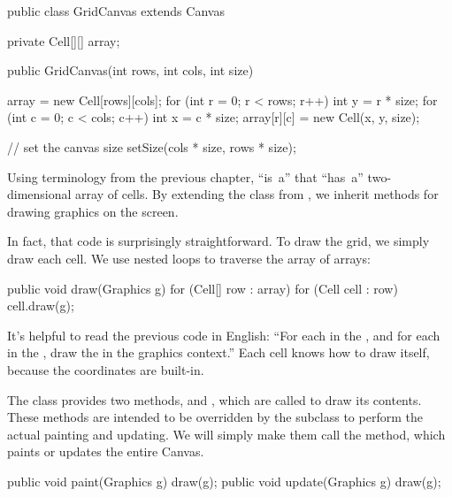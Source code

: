\begin{code}
public class GridCanvas extends Canvas {
    private Cell[][] array;

    public GridCanvas(int rows, int cols, int size) {
        array = new Cell[rows][cols];
        for (int r = 0; r < rows; r++) {
            int y = r * size;
            for (int c = 0; c < cols; c++) {
                int x = c * size;
                array[r][c] = new Cell(x, y, size);
            }
        }

        // set the canvas size
        setSize(cols * size, rows * size);
    }
}
\end{code}


Using terminology from the previous chapter,  ``is~a''  that ``has~a'' two-dimensional array of cells.
By extending the  class from , we inherit methods for drawing graphics on the screen.

In fact, that code is surprisingly straightforward.
To draw the grid, we simply draw each cell.
We use nested  loops to traverse the array of arrays:

\begin{code}
public void draw(Graphics g) {
    for (Cell[] row : array) {
        for (Cell cell : row) {
            cell.draw(g);
        }
    }
}
\end{code}

It's helpful to read the previous code in English: ``For each  in the , and for each  in the , draw the  in the graphics context.''
Each cell knows how to draw itself, because the coordinates are built-in.

The  class provides two methods,  and , which are called to draw its contents.
These methods are intended to be overridden by the subclass to perform the actual painting and updating.
We will simply make them call the  method, which paints or updates the entire Canvas.


\begin{code}
public void paint(Graphics g) {
    draw(g);
}
public void update(Graphics g) {
    draw(g);
}
\end{code}

